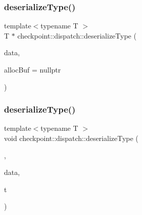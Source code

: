 \subsubsection{\texorpdfstring{deserialize\+Type()}{deserializeType()}\hspace{0.1cm}{\footnotesize\ttfamily [1/2]}}
{\footnotesize\ttfamily template$<$typename T $>$ \\
T $\ast$ checkpoint\+::dispatch\+::deserialize\+Type (\begin{DoxyParamCaption}\item[{\hyperlink{namespacecheckpoint_ae57f01cdc0b81776c23b6c7c934c58f5}{Serial\+Byte\+Type} $\ast$}]{data,  }\item[{\hyperlink{namespacecheckpoint_ae57f01cdc0b81776c23b6c7c934c58f5}{Serial\+Byte\+Type} $\ast$}]{alloc\+Buf = {\ttfamily nullptr} }\end{DoxyParamCaption})}

\mbox{\label{namespacecheckpoint_1_1dispatch_a1830f5dccc7209dc2bbb3b7ac238c36a}} 
\subsubsection{\texorpdfstring{deserialize\+Type()}{deserializeType()}\hspace{0.1cm}{\footnotesize\ttfamily [2/2]}}
{\footnotesize\ttfamily template$<$typename T $>$ \\
void checkpoint\+::dispatch\+::deserialize\+Type (\begin{DoxyParamCaption}\item[{\hyperlink{structcheckpoint_1_1dispatch_1_1_in_place_tag}{In\+Place\+Tag}}]{,  }\item[{\hyperlink{namespacecheckpoint_ae57f01cdc0b81776c23b6c7c934c58f5}{Serial\+Byte\+Type} $\ast$}]{data,  }\item[{T $\ast$}]{t }\end{DoxyParamCaption})}

\mbox{\label{namespacecheckpoint_1_1dispatch_aca3c0f09e49b43fb6f3d82fe39e89295}} 
